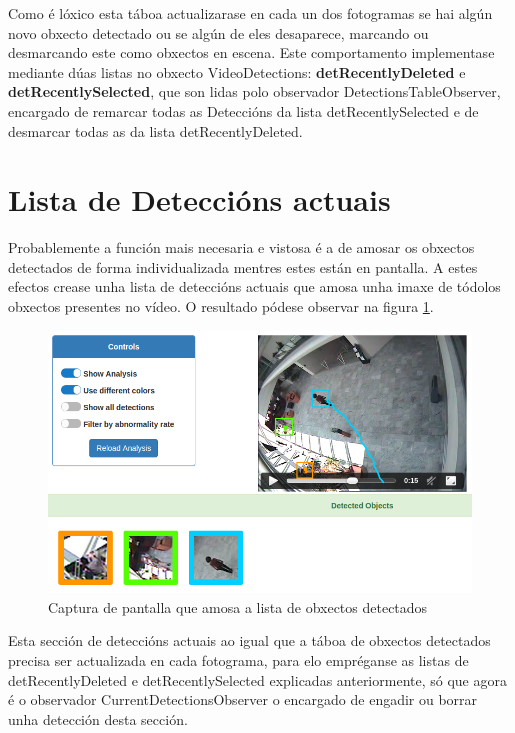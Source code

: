     Como é lóxico esta táboa actualizarase en cada un dos fotogramas se hai algún novo obxecto 
    detectado ou se algún de eles desaparece, marcando ou desmarcando este como obxectos en escena.
    Este comportamento implementase mediante dúas listas no obxecto VideoDetections: 
    \textbf{detRecentlyDeleted} e \textbf{detRecentlySelected}, que son lidas polo observador 
    DetectionsTableObserver, encargado de remarcar todas as Deteccións da lista detRecentlySelected
    e de desmarcar todas as da lista detRecentlyDeleted.
    
\section{Lista de Deteccións actuais}

    Probablemente a función mais necesaria e vistosa é a de amosar os obxectos detectados de forma 
    individualizada mentres estes están en pantalla. A estes efectos crease unha lista de deteccións
    actuais que amosa unha imaxe de tódolos obxectos presentes no vídeo. O resultado pódese observar
    na figura \ref{fig:detectedObjects}.
    
    \begin{figure}[htp]
    \begin{center}
        \includegraphics[scale=0.4]{figures/detectedObjects.png}
        \caption{Captura de pantalla que amosa a lista de obxectos detectados}
    \label{fig:detectedObjects}
    \end{center}
    \end{figure}
   
    Esta sección de deteccións actuais ao igual que a táboa de obxectos detectados precisa ser 
    actualizada en cada fotograma, para elo empréganse as listas de detRecentlyDeleted e 
    detRecentlySelected explicadas anteriormente, só que agora é o observador 
    CurrentDetectionsObserver o encargado de engadir ou borrar unha detección desta sección.
    
